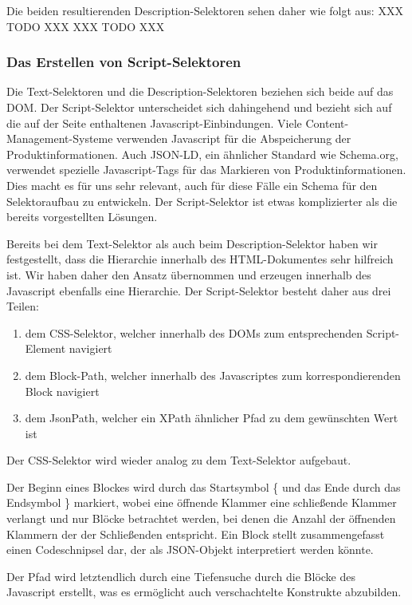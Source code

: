 Die beiden resultierenden Description-Selektoren sehen daher wie folgt aus:
XXX TODO XXX
XXX TODO XXX

\subsubsection{Das Erstellen von Script-Selektoren}
\label{subsubsec:erstellen-von-script-selektoren}

Die Text-Selektoren und die Description-Selektoren beziehen sich beide auf das DOM.
Der Script-Selektor unterscheidet sich dahingehend und bezieht sich auf die auf der Seite enthaltenen
Javascript-Einbindungen.
Viele Content-Management-Systeme verwenden Javascript für die Abspeicherung der Produktinformationen.
Auch JSON-LD, ein ähnlicher Standard wie Schema.org, verwendet spezielle Javascript-Tags für das Markieren von
Produktinformationen.
Dies macht es für uns sehr relevant, auch für diese Fälle ein Schema für den Selektoraufbau zu entwickeln.
Der Script-Selektor ist etwas komplizierter als die bereits vorgestellten Lösungen.

Bereits bei dem Text-Selektor als auch beim Description-Selektor haben wir festgestellt, dass die Hierarchie
innerhalb des HTML-Dokumentes sehr hilfreich ist.
Wir haben daher den Ansatz übernommen und erzeugen innerhalb des Javascript ebenfalls eine Hierarchie.
Der Script-Selektor besteht daher aus drei Teilen:
\begin{enumerate}
    \item dem CSS-Selektor, welcher innerhalb des DOMs zum entsprechenden Script-Element navigiert
    \item dem Block-Path, welcher innerhalb des Javascriptes zum korrespondierenden Block navigiert
    \item dem JsonPath, welcher ein XPath ähnlicher Pfad zu dem gewünschten Wert ist
\end{enumerate}

Der CSS-Selektor wird wieder analog zu dem Text-Selektor aufgebaut.

Der Beginn eines Blockes wird durch das Startsymbol \{ und das Ende durch das Endsymbol \} markiert, wobei eine
öffnende Klammer eine schließende Klammer verlangt und nur Blöcke betrachtet werden, bei denen die Anzahl der
öffnenden Klammern der der Schließenden entspricht.
Ein Block stellt zusammengefasst einen Codeschnipsel dar, der als JSON-Objekt interpretiert werden könnte.

Der Pfad wird letztendlich durch eine Tiefensuche durch die Blöcke des Javascript erstellt, was es ermöglicht auch
verschachtelte Konstrukte abzubilden.

